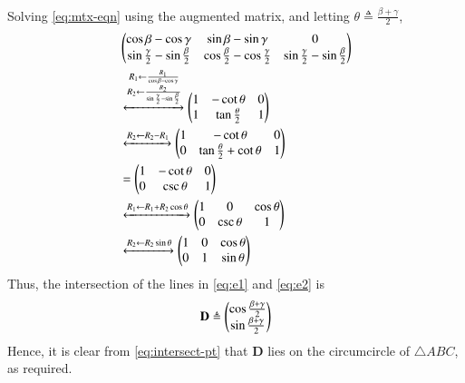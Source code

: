 \documentclass[journal,12pt,twocolumn]{IEEEtran}
\renewcommand{\vec}[1]{\boldsymbol{\mathbf{#1}}}
\begin{document}
\begin{enumerate}
\begin{align}
        \label{eq:mtx-eqn}
    \end{align}
    Solving \eqref{eq:mtx-eqn} using the augmented matrix, and letting 
    $\theta \triangleq \frac{\beta+\gamma}{2}$,
    \begin{align}
        &\begin{pmatrix}\cos\beta-\cos\gamma&\sin\beta-\sin\gamma&0\\\sin\frac{\gamma}{2}-\sin\frac{\beta}{2}&\cos\frac{\beta}{2}-\cos\frac{\gamma}{2}&\sin\frac{\gamma}{2}-\sin\frac{\beta}{2}\end{pmatrix} \\
        &\xleftrightarrow[]{\substack{R_1\leftarrow\frac{R_1}{\cos\beta-\cos\gamma}\\R_2\leftarrow\frac{R_2}{\sin\frac{\gamma}{2}-\sin\frac{\beta}{2}}}}\begin{pmatrix}1&-\cot\theta&0\\1&\tan\frac{\theta}{2}&1\end{pmatrix} \\
        &\xleftrightarrow[]{R_2\leftarrow R_2-R_1}\begin{pmatrix}1&-\cot\theta&0\\0&\tan\frac{\theta}{2}+\cot\theta&1\end{pmatrix} \\
        &= \begin{pmatrix}1&-\cot\theta&0\\0&\csc\theta&1\end{pmatrix} \\
        &\xleftrightarrow[]{R_1\leftarrow R_1 + R_2\cos\theta}\begin{pmatrix}1&0&\cos\theta\\0&\csc\theta&1\end{pmatrix} \\
        &\xleftrightarrow[]{R_2\leftarrow R_2\sin\theta}\begin{pmatrix}1&0&\cos\theta\\0&1&\sin\theta\end{pmatrix}
        \label{eq:aug-mtx}
    \end{align}
    Thus, the intersection of the lines in \eqref{eq:e1} and \eqref{eq:e2} is
    \begin{align}
        \vec{D} \triangleq \myvec{\cos\frac{\beta+\gamma}{2}\\\sin\frac{\beta+\gamma}{2}}
        \label{eq:intersect-pt}
    \end{align}
    Hence, it is clear from \eqref{eq:intersect-pt} that $\vec{D}$ lies on the 
    circumcircle of $\triangle ABC$, as required.


\end{enumerate}
\end{document}
